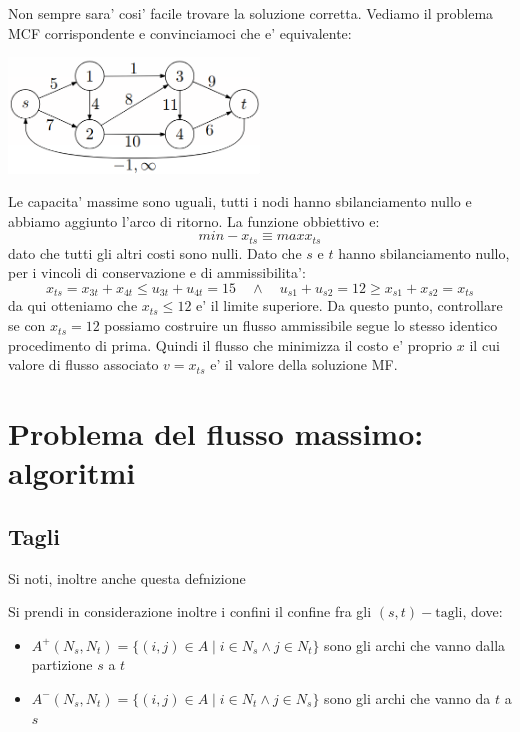 {  Non sempre sara' cosi' facile trovare la soluzione corretta. Vediamo il problema MCF corrispondente e convinciamoci che e' equivalente:
  \begin{center}
    \includegraphics[width=0.5\textwidth]{img/2025-03-13-11-38-15.png}
  \end{center}

Le capacita' massime sono uguali, tutti i nodi hanno sbilanciamento nullo e abbiamo aggiunto l'arco di ritorno. La funzione obbiettivo e:
\[
min -x_{ts} \equiv max x_{ts}
\]
dato che tutti gli altri costi sono nulli. Dato che $ s  $ e $ t $ hanno sbilanciamento nullo, per i vincoli di conservazione e di ammissibilita':
\[
x_{ts} = x_{3t} + x_{4t} \leq u_{3t} + u_{4t} = 15 \quad \land \quad u_{s1} + u_{s2} = 12 \geq x_{s1} + x_{s2} = x_{ts}
\]
da qui otteniamo che $ x_{ts} \leq 12 $ e' il limite superiore. Da questo punto, controllare se con $ x_{ts} = 12 $ possiamo costruire un flusso ammissibile segue lo stesso identico procedimento di prima. Quindi il flusso che minimizza il costo e' proprio $ x $ il cui valore di flusso associato $ v = x_{ts} $ e' il valore della soluzione MF.
}
  
\section{Problema del flusso massimo: algoritmi}

\subsection{Tagli}


Si noti, inoltre anche questa defnizione

Si prendi in considerazione inoltre i confini il confine fra gli $(s,t)-\text{tagli}$, dove:
\begin{itemize}
  \item $A^+(N_s, N_t) = \{(i,j) \in A \mid i \in N_s \land j \in N_t\}$ sono gli archi che vanno dalla partizione $s$ a $t$
  \item $ A^-(N_s,N_t)=\{(i,j)\in A\mid i\in N_t\land j\in N_s\} $ sono gli archi che vanno da $t$ a $s$
\end{itemize}



